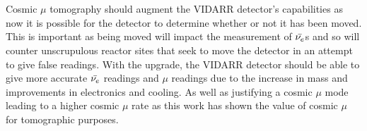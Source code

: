 \\\\Cosmic $\mu$ tomography should augment the VIDARR detector's capabilities as now it is possible for the detector to determine whether or not it has been moved. This is important as being moved will impact the measurement of $\Bar{\nu_e}$s and so will counter unscrupulous reactor sites that seek to move the detector in an attempt to give false readings. With the upgrade, the VIDARR detector should be able to give more accurate $\Bar{\nu_e}$ readings and $\mu$ readings due to the increase in mass and improvements in electronics and cooling. As well as justifying a cosmic $\mu$ mode leading to a higher cosmic $\mu$ rate as this work has shown the value of cosmic $\mu$ for tomographic purposes. 